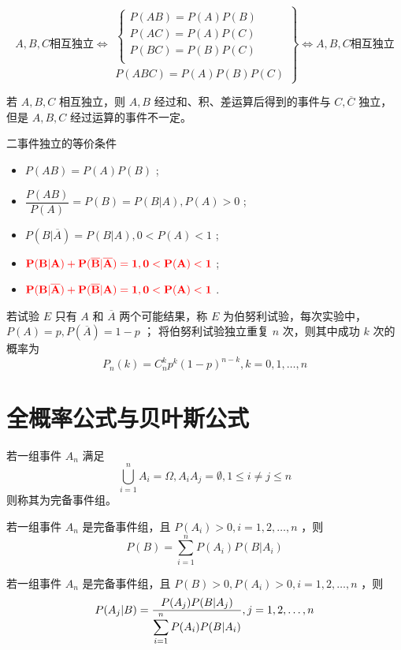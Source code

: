\begin{equation*}
    A,B,C\textrm{相互独立}\Leftrightarrow\left.\begin{array}{r}
        \begin{cases}
            P(AB) = P(A)P(B)\\
            P(AC) = P(A)P(C)\\
            P(BC) = P(B)P(C)\\
        \end{cases}\\P(ABC)=P(A)P(B)P(C)
    \end{array}\right\}\Leftrightarrow A,B,C \textrm{相互独立}
\end{equation*}

若 $ A,B,C $ 相互独立，则 $ A,B $ 经过和、积、差运算后得到的事件与 $ C,\overline C $ 独立，
但是 $ A,B,C $ 经过运算的事件不一定。

二事件独立的等价条件

\begin{itemize}
    \item $ P(AB)=P(A)P(B) $ ;
    \item $ \dfrac{P(AB)}{P(A)} = P(B) = P(B|A), P(A)>0 $ ;
    \item $ P(B|\overline A) = P(B|A),0<P(A)<1 $ ;
    \item $ \textcolor{red}{\bf{P(B|A)+P(\overline B|\overline A) = 1,0<P(A)<1}} $ ;
    \item $ \textcolor{red}{\bf{P(B|\overline A)+P(\overline B|A) = 1,0<P(A)<1}} $ .
\end{itemize}


若试验 $ E $ 只有 $ A $ 和 $ \overline{A} $ 两个可能结果，称
$ E $ 为伯努利试验，每次实验中，$ P(A) = p,P(\overline A) = 1-p $ ；
将伯努利试验独立重复 $ n $ 次，则其中成功 $ k $ 次的概率为
$$
    P_n(k) = C_n^kp^k(1-p)^{n-k},k = 0,1,\dots,n
$$ 

\section{全概率公式与贝叶斯公式}

\begin{Field}[完备事件组]

    若一组事件 $ A_n $ 满足$$
        \bigcup_{i=1}^nA_i = \Omega,A_iA_j = \emptyset, 1 \leq i \neq j \leq n
    $$ 则称其为完备事件组。
\end{Field}

\begin{Field}[全概率公式]

    若一组事件 $ A_n $ 是完备事件组，且 $ P(A_i) > 0,i = 1,2,\dots,n $ ，则$$
        P(B) = \sum_{i=1}^nP(A_i)P(B|A_i)
    $$ 
\end{Field}

\begin{Field}[贝叶斯公式]

    若一组事件 $ A_n $ 是完备事件组，且 $P(B)>0, P(A_i) > 0,i = 1,2,\dots,n $ ，则
    $$
        P(A_j|B) = \dfrac{P(A_j)P(B|A_j)}{\displaystyle \sum_{i=1}^nP(A_i)P(B|A_i)},j = 1,2,\dots,n
    $$ 
\end{Field}

